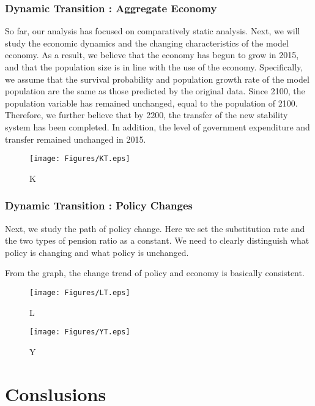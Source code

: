 \documentclass{article}
\begin{document}
        \subsubsection{Dynamic Transition : Aggregate Economy}
            So far, our analysis has focused on comparatively static analysis. Next, we will study the economic dynamics and the changing characteristics of the model economy. As a result, we believe that the economy has begun to grow in 2015, and that the population size is in line with the use of the economy. Specifically, we assume that the survival probability and population growth rate of the model population are the same as those predicted by the original data. Since 2100, the population variable has remained unchanged, equal to the population of 2100. Therefore, we further believe that by 2200, the transfer of the new stability system has been completed. In addition, the level of government expenditure and transfer remained unchanged in 2015.
            \begin{figure}[H]
                \centering
                \texttt{[image: Figures/KT.eps]}
                \caption{K}
            \end{figure}
         
        \subsubsection{Dynamic Transition : Policy Changes}
            Next, we study the path of policy change. Here we set the substitution rate and the two types of pension ratio as a constant. We need to clearly distinguish what policy is changing and what policy is unchanged.
            
            From the graph, the change trend of policy and economy is basically consistent.
            \begin{figure}[H]
                \centering
                \texttt{[image: Figures/LT.eps]}
                \caption{L}
            \end{figure}

            \begin{figure}[H]
                \centering
                \texttt{[image: Figures/YT.eps]}
                \caption{Y}
            \end{figure}
    


\section{Conslusions}
%    
    
        
\end{document}
